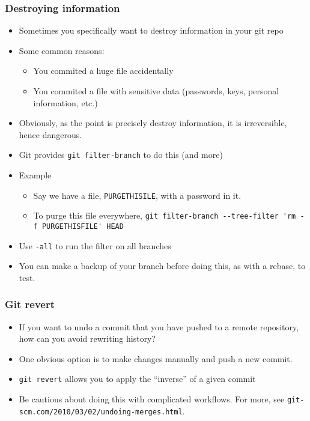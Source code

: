 \begin{frame}[fragile]
\frametitle{Destroying information}
\begin{itemize}
\item Sometimes you specifically want to destroy information in your git repo
\item Some common reasons:
\begin{itemize}
\item You commited a huge file accidentally
\item You commited a file with sensitive data (passwords, keys, personal information, etc.)
\end{itemize}
\item Obviously, as the point is precisely destroy information, it is irreversible, hence dangerous.
\item Git provides \lstinline{git filter-branch} to do this (and more)
\item Example
\begin{itemize}
  \item Say we have a file, \lstinline{PURGETHISILE}, with a password in it.
\item To purge this file everywhere, \lstinline{git filter-branch --tree-filter 'rm -f PURGETHISFILE' HEAD}
\end{itemize}
\item Use \texttt{-all} to run the filter on all branches
\item You can make a backup of your branch before doing this, as with a rebase, to test.
\end{itemize}
\end{frame}

\begin{frame}[fragile]
\frametitle{Git revert}
\begin{itemize}
\item If you want to undo a commit that you have pushed to a remote repository, how can you avoid rewriting history?
\item One obvious option is to make changes manually and push a new commit.
\item \lstinline{git revert} allows you to apply the ``inverse'' of a given commit
\item Be cautious about doing this with complicated workflows. For more, see \texttt{git-scm.com/2010/03/02/undoing-merges.html}.
\end{itemize}
\end{frame}

